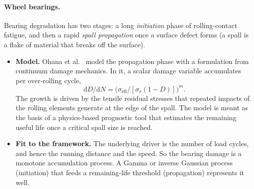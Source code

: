 \documentclass[11pt,a4paper]{article}
\theoremstyle{plain}
\theoremstyle{definition}
\theoremstyle{remark}
\begin{document}
\paragraph{Wheel bearings.}
Bearing degradation has two stages: a long \emph{initiation} phase of rolling-contact fatigue, and then a rapid \emph{spall propagation} once a surface defect forms (a spall is a flake of material that breaks off the surface).
\begin{itemize}
  \item \textbf{Model.}
    Ohana et al.~\cite[Sec.~2.1.3]{Ohana2023} model the propagation phase with a formulation from continuum damage mechanics.
    In it, a scalar damage variable accumulates per over-rolling cycle,
    \begin{equation}
      \mathrm{d}D/\mathrm{d}N = \bigl(\sigma_{\mathrm{eff}}/[\sigma_r(1-D)]\bigr)^m.
    \end{equation}
    The growth is driven by the tensile residual stresses that repeated impacts of the rolling elements generate at the edge of the spall.
    The model is meant as the basis of a physics-based prognostic tool that estimates the remaining useful life once a critical spall size is reached.
  \item \textbf{Fit to the framework.}
    The underlying driver is the number of load cycles, and hence the running distance and the speed.
    So the bearing damage is a monotone accumulation process.
    A Gamma or inverse Gaussian process (initiation) that feeds a remaining-life threshold (propagation) represents it well.
\end{itemize}
\end{document}
